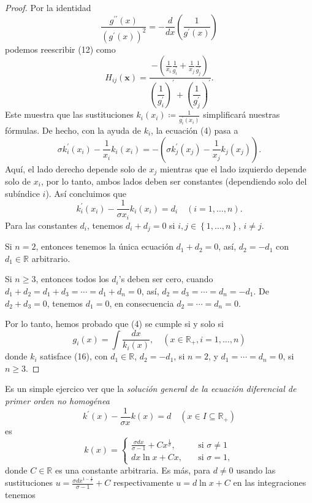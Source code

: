 \documentclass[a4paper,fleqn]{cas-dc}
\begin{document}
\begin{proof}
Por la identidad \[ \frac{g^{\prime\prime}\left(x\right)}{{\left(g^{\prime}\left(x\right)\right)}^{2}}=-\frac{d}{dx}\left(\dfrac{1}{g^{\prime}\left(x\right)}\right) \] podemos reescribir (12) como \[ H_{ij}\left(\bm{x}\right)=\frac{-\left(\frac{1}{x_{i}}\frac{1}{g^{\prime}_{i}}+\frac{1}{x_{j}}\frac{1}{g^{\prime}_{j}}\right)}{{\left(\dfrac{1}{g^{\prime}_{i}}\right)}^{\prime}+{\left(\dfrac{1}{g^{\prime}_{j}}\right)}^{\prime}}. \] Este muestra que las sustituciones $k_{i}\left(x_{i}\right)\coloneqq\frac{1}{g^{\prime}_{i}\left(x_{i}\right)}$ simplificará nuestras fórmulas. De hecho, con la ayuda de $k_{i}$, la ecuación (4) pasa a \[ \sigma k^{\prime}_{i}\left(x_{i}\right)-\frac{1}{x_{i}}k_{i}\left(x_{i}\right)=-\left(\sigma k^{\prime}_{j}\left(x_{j}\right)-\frac{1}{x_{j}}k_{j}\left(x_{j}\right)\right). \] Aquí, el lado derecho depende solo de $x_{j}$ mientras que el lado izquierdo depende solo de $x_{i}$, por lo tanto, ambos lados deben ser constantes (dependiendo solo del subíndice $i$). Así concluimos que
\begin{equation}
k^{\prime}_{i}\left(x_{i}\right)-\frac{1}{\sigma x_{i}}k_{i}\left(x_{i}\right)=d_{i}\quad\left(i=1,\ldots,n\right).
\end{equation}
Para las constantes $d_{i}$, tenemos $d_{i}+d_{j}=0$ si $i,j\in\left\{1,\ldots,n\right\}$, $i\neq j$.

Si $n=2$, entonces tenemos la única ecuación $d_{1}+d_{2}=0$, así, $d_{2}=-d_{1}$ con $d_{1}\in\mathds{R}$ arbitrario.

Si $n\geq3$, entonces todos los $d_{i}$'s deben ser cero, cuando $d_{1}+d_{2}=d_{1}+d_{3}=\cdots=d_{1}+d_{n}=0$, así, $d_{2}=d_{3}=\cdots=d_{n}=-d_{1}$. De $d_{2}+d_{3}=0$, tenemos $d_{1}=0$, en consecuencia $d_{2}=\cdots=d_{n}=0$.

Por lo tanto, hemos probado que (4) se cumple si y solo si \[ g_{i}\left(x\right)=\int\frac{dx}{k_{i}\left(x\right)},\quad\left(x\in\mathds{R}_{+},i=1,\ldots,n\right) \] donde $k_{i}$ satisface (16), con $d_{1}\in\mathds{R}$, $d_{2}=-d_{1}$, si $n=2$, y $d_{1}=\cdots=d_{n}=0$, si $n\geq3$.
\end{proof}
Es un simple ejercico ver que la \emph{solución general de la ecuación diferencial de primer orden no homogénea} \[ k^{\prime}\left(x\right)-\frac{1}{\sigma x}k\left(x\right)=d\quad\left(x\in I\subseteq\mathds{R}_{+}\right) \] es \[ k\left(x\right)=\begin{cases}\frac{\sigma dx}{\sigma-1}+Cx^{\frac{1}{\sigma}},\quad&\text{si }\sigma\neq1\\dx\ln x+Cx,\quad&\text{si }\sigma=1,\end{cases} \] donde $C\in\mathds{R}$ es una constante arbitraria. Es más, para $d\neq0$ usando las sustituciones $u=\frac{\sigma dx^{1-\frac{1}{\sigma}}}{\sigma-1}+C$ respectivamente $u=d\ln x+C$ en las integraciones tenemos
\end{document}
